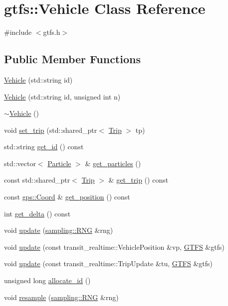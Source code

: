 \hypertarget{classgtfs_1_1Vehicle}{}\section{gtfs\+:\+:Vehicle Class Reference}
\label{classgtfs_1_1Vehicle}


{\ttfamily \#include $<$gtfs.\+h$>$}

\subsection*{Public Member Functions}
\begin{DoxyCompactItemize}
\item 
\hyperlink{classgtfs_1_1Vehicle_ac3f8111a611378f5f8b29f7465e48919}{Vehicle} (std\+::string id)
\item 
\hyperlink{classgtfs_1_1Vehicle_adf892e71483b7f9005846599fd0308e6}{Vehicle} (std\+::string id, unsigned int n)
\item 
\hyperlink{classgtfs_1_1Vehicle_a08c7450dd0df9406f78b30be044d27d8}{$\sim$\+Vehicle} ()
\item 
void \hyperlink{classgtfs_1_1Vehicle_a47ceaf4bb31c01dd4b26a12f1b7b7089}{set\+\_\+trip} (std\+::shared\+\_\+ptr$<$ \hyperlink{classgtfs_1_1Trip}{Trip} $>$ tp)
\item 
std\+::string \hyperlink{classgtfs_1_1Vehicle_a6b388986c9ed4af1eb86f13a3d2de8e0}{get\+\_\+id} () const
\item 
std\+::vector$<$ \hyperlink{classgtfs_1_1Particle}{Particle} $>$ \& \hyperlink{classgtfs_1_1Vehicle_a7b12b079c68880f00f532ca25858c368}{get\+\_\+particles} ()
\item 
const std\+::shared\+\_\+ptr$<$ \hyperlink{classgtfs_1_1Trip}{Trip} $>$ \& \hyperlink{classgtfs_1_1Vehicle_a616c83927f0d2d513d33277a9ebd3537}{get\+\_\+trip} () const
\item 
const \hyperlink{classgps_1_1Coord}{gps\+::\+Coord} \& \hyperlink{classgtfs_1_1Vehicle_a108b44eeddcd90ebae8f6391f157c503}{get\+\_\+position} () const
\item 
int \hyperlink{classgtfs_1_1Vehicle_a23c0a191559e4066423d5f3cbfb70b46}{get\+\_\+delta} () const
\item 
void \hyperlink{classgtfs_1_1Vehicle_a4baee648ab1db5b69aa2ffef7203c2bf}{update} (\hyperlink{classsampling_1_1RNG}{sampling\+::\+R\+NG} \&rng)
\item 
void \hyperlink{classgtfs_1_1Vehicle_add9266d843398c88d3fcc22239f586a9}{update} (const transit\+\_\+realtime\+::\+Vehicle\+Position \&vp, \hyperlink{classgtfs_1_1GTFS}{G\+T\+FS} \&gtfs)
\item 
void \hyperlink{classgtfs_1_1Vehicle_ae9944f06fb0bde02f2d7c21f2dc33787}{update} (const transit\+\_\+realtime\+::\+Trip\+Update \&tu, \hyperlink{classgtfs_1_1GTFS}{G\+T\+FS} \&gtfs)
\item 
unsigned long \hyperlink{classgtfs_1_1Vehicle_aa9087e973a9821f384ec47f51bdcedc7}{allocate\+\_\+id} ()
\item 
void \hyperlink{classgtfs_1_1Vehicle_a8367fc70a64b7e596422f880dbff1193}{resample} (\hyperlink{classsampling_1_1RNG}{sampling\+::\+R\+NG} \&rng)
\end{DoxyCompactItemize}
